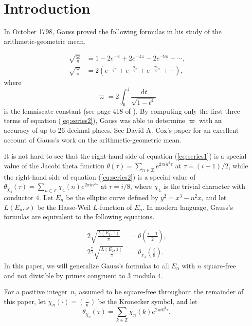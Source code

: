 \documentclass[11pt, reqno]{amsart}
\theoremstyle{plain}
\theoremstyle{definition}
\numberwithin{equation}{section}
\begin{document}
\section{Introduction}
In October 1798, Gauss proved the following  formulas in his study of the arithmetic-geometric mean,

\begin{align}
\sqrt{\frac{\varpi}{\pi}}& = 1 - 2e^{-\pi} + 2e^{-4\pi} - 2e^{-9\pi} + \cdots\text{,} \label{eq:series1}\\
\sqrt{\frac{\varpi}{\pi}}& =2\left(e^{-\frac{1}{4}\pi} + e^{-\frac{9}{4}\pi} +e^{-\frac{25}{4}\pi} + \cdots\right)\text{,} \label{eq:series2} 
\end{align}
where 
\[
\varpi=2 \int_0^1 \frac{\mathrm{~d} t}{\sqrt{1-t^4}} 
\] is the lemniscate constant (see page 418 of \cite{Gauss1}).
 By computing only  the first three terms of equation (\ref{eq:series2}), Gauss was able to determine $\varpi$ with an accuracy of up to 26 decimal places.
See David A. Cox's paper \cite{Cox1984} for an excellent account of Gauss's work on the arithmetic-geometric mean.

It is not hard to see that the right-hand side of equation (\ref{eq:series1}) is a special value of the Jacobi theta function $\theta(\tau)=\sum_{n\in \mathbb{Z}}e^{2\pi i n^2\tau}$ at $\tau=(i+1)/2$, while the right-hand side of equation (\ref{eq:series2}) is a special value of $\theta_{\chi_4}(\tau)=\sum_{n\in \mathbb{Z}}\chi_4(n)e^{2\pi i n^2\tau}$ at $\tau=i/8$, where $\chi_4$ is the trivial character with conductor $4$.
Let $E_n$ be the elliptic curve defined by $y^2=x^3-n^2x$, and let $L(E_n,s)$ be the Hasse-Weil $L$-function of   $E_n$. 
In modern language, Gauss's formulas are equivalent to the following equations.

\begin{align}
2\sqrt{\frac{L(E_1,1)}{\pi}}&=\theta\left(\frac{i+1}{2}\right)\text{,} \label{eq1.3}\\
2^{\frac{7}{4}}\sqrt{\frac{L(E_2,1)}{\pi}}&=\theta_{\chi_4}\left(\frac{i}{8}\right)\text{.}\label{eq1.4}
\end{align} 
In this paper, we will generalize Gauss's  formulas to all $E_n$ with $n$ square-free and not divisible by primes congruent to $3$ modulo $4$. %

For a positive integer~$n$, assumed to be square-free throughout the remainder of this paper, let
$\chi_{n}(\cdot)=\left(\frac{\cdot}{n}\right)$ be the Kronecker symbol, and let $$
\theta_{\chi_n}(\tau)=\sum_{k\in \mathbb{Z}}\chi_n(k)e^{2\pi i k^2\tau}.
$$ 
\end{document}
